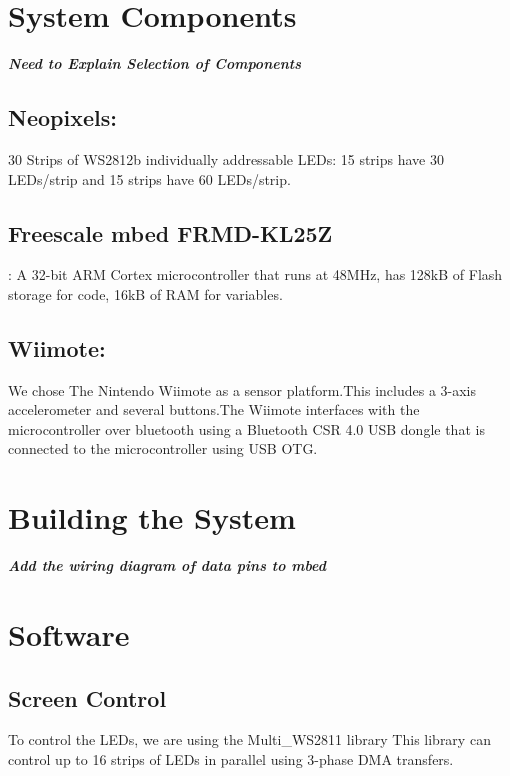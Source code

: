 \documentclass{tufte-handout}
\begin{document}
\section{\textbf{System Components}}
\textit{\textbf{Need to Explain Selection of Components}}
\subsection{Neopixels:}
30 Strips of WS2812b individually addressable LEDs: 15 strips have 30 LEDs/strip and 15 strips have 60 LEDs/strip.
\subsection{Freescale mbed FRMD-KL25Z}:
A 32-bit ARM Cortex microcontroller that runs at 48MHz, has 128kB of Flash storage for code, 16kB of RAM for variables.
\subsection{Wiimote:}
We chose The Nintendo Wiimote as a sensor platform.This includes a 3-axis accelerometer and several buttons.The Wiimote interfaces with the microcontroller over bluetooth using a Bluetooth CSR 4.0 USB dongle that is connected to the microcontroller using USB OTG.
\section{\textbf{Building the System}}
\textbf{\textit{Add the wiring diagram of data pins to mbed  }}
\section{\textbf{Software}}
\subsection{Screen Control}
To control the LEDs, we are using the Multi\_WS2811 library This library can control up to 16 strips of LEDs in
parallel using 3-phase DMA transfers. 
\end{document}
